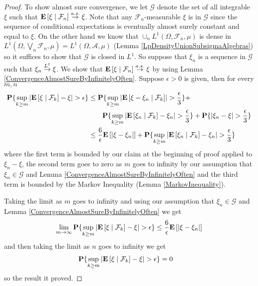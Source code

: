\begin{proof}
To show almost sure convergence, we let $\mathcal{G}$ denote the set
of all integrable $\xi$ such that
$\cexpectationlong{\mathcal{F}_n}{\xi} \toas \xi$.  Note that any
$\mathcal{F}_n$-measurable $\xi$ is in $\mathcal{G}$ since the sequence
of conditional expectations is eventually almost surely constant and
equal to $\xi$.  On the other hand we know that $\cup_n
L^1(\Omega, \mathcal{F}_n, \mu)$ is dense in $L^1(\Omega, \bigvee_n
  \mathcal{F}_n, \mu) = L^1(\Omega, \mathcal{A}, \mu)$ (Lemma
  \ref{LpDensityUnionSubsigmaAlgebras}) so it suffices to show that
  $\mathcal{G}$ is closed in $L^1$.  So suppose that $\xi_n$ is a
  sequence in $\mathcal{G}$ such that $\xi_n \tolp{1} \xi$.  We show
  that $\cexpectationlong{\mathcal{F}_n}{\xi} \toas \xi$ by using
  Lemma \ref{ConvergenceAlmostSureByInfinitelyOften}.  Suppose
  $\epsilon > 0$ is given, then for every $m,n$
\begin{align*}\begin{split}
\probability{\sup_{k \geq m} \abs{\cexpectationlong{\mathcal{F}_k}{\xi} - \xi} >
  \epsilon} &\leq \probability{\sup_{k \geq m}
  \abs{\cexpectationlong{\mathcal{F}_k}{\xi-\xi_n}} >
  \frac{\epsilon}{3}} + \\
&\qquad \probability{\sup_{k \geq m}
  \abs{\cexpectationlong{\mathcal{F}_k}{\xi_n} - \xi_n} >
  \frac{\epsilon}{3}} + \probability{\abs{\xi_n - \xi} >
  \frac{\epsilon}{3}} \\
&\leq \frac{6}{\epsilon} \expectation{\abs{\xi - \xi_n} } +
\probability{\sup_{k \geq m}
  \abs{\cexpectationlong{\mathcal{F}_k}{\xi_n} - \xi_n} >
  \frac{\epsilon}{3}} \\
\end{split}
\end{align*}
where the first term is bounded by our claim at the beginning of
proof applied to $\xi_n - \xi$, the second term goes to zero as $m$ goes to infinity by our assumption that
$\xi_n \in \mathcal{G}$ and Lemma
\ref{ConvergenceAlmostSureByInfinitelyOften} and the third term is
bounded by the Markov Inequality (Lemma
\ref{MarkovInequality}).

Taking the limit as $m$ goes to infinity and using our assumption that
$\xi_n \in \mathcal{G}$ and Lemma
\ref{ConvergenceAlmostSureByInfinitelyOften} we get
\begin{align*}
\lim_{m \to \infty} \probability{\sup_{k \geq m} \abs{\cexpectationlong{\mathcal{F}_k}{\xi} - \xi} >
  \epsilon} &\leq \frac{6}{\epsilon} \expectation{\abs{\xi - \xi_n} }
\\
\end{align*}
and then taking the limit as $n$ goes to infinity we get
\begin{align*}
\probability{\sup_{k \geq m} \abs{\cexpectationlong{\mathcal{F}_k}{\xi} - \xi} >
  \epsilon}&=0
\end{align*}
 so the result it proved.
\end{proof}
